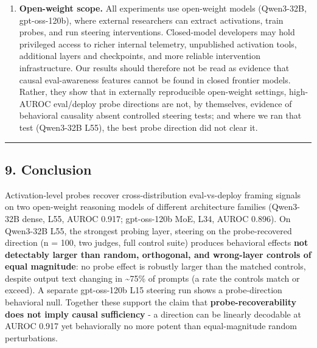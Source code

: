 \documentclass[
]{article}
\begin{document}
\begin{enumerate}
  mxfp4 kernel paths interacting with the standard PyTorch
  \texttt{register\_forward\_hook}. A direct propagation diagnostic
  (e.g., \texttt{register\_forward\_pre\_hook} on the next layer to
  verify it receives the modified output) has not been completed here.
\item
  \textbf{Open-weight scope.} All experiments use open-weight models
  (Qwen3-32B, gpt-oss-120b), where external researchers can extract
  activations, train probes, and run steering interventions.
  Closed-model developers may hold privileged access to richer internal
  telemetry, unpublished activation tools, additional layers and
  checkpoints, and more reliable intervention infrastructure. Our
  results should therefore not be read as evidence that causal
  eval-awareness features cannot be found in closed frontier models.
  Rather, they show that in externally reproducible open-weight
  settings, high-AUROC eval/deploy probe directions are not, by
  themselves, evidence of behavioral causality absent controlled
  steering tests; and where we ran that test (Qwen3-32B L55), the best
  probe direction did not clear it.
\end{enumerate}

\begin{center}\rule{0.5\linewidth}{0.5pt}\end{center}

\subsection{9. Conclusion}\label{conclusion}

Activation-level probes recover cross-distribution eval-vs-deploy
framing signals on two open-weight reasoning models of different
architecture families (Qwen3-32B dense, L55, AUROC 0.917; gpt-oss-120b
MoE, L34, AUROC 0.896). On Qwen3-32B L55, the strongest probing layer,
steering on the probe-recovered direction (n = 100, two judges, full
control suite) produces behavioral effects \textbf{not detectably larger
than random, orthogonal, and wrong-layer controls of equal magnitude}:
no probe effect is robustly larger than the matched controls, despite
output text changing in \textasciitilde75\% of prompts (a rate the
controls match or exceed). A separate gpt-oss-120b L15 steering run
shows a probe-direction behavioral null. Together these support the
claim that \textbf{probe-recoverability does not imply causal
sufficiency} - a direction can be linearly decodable at AUROC 0.917 yet
behaviorally no more potent than equal-magnitude random perturbations.
\end{document}
